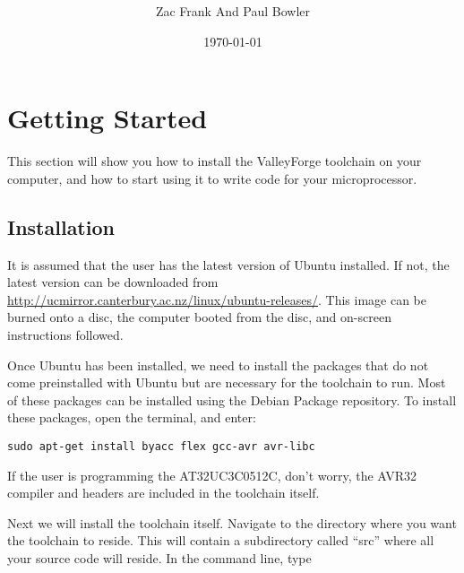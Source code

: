 \documentclass[a4paper, oneside, 11pt, titlepage, onecolumn, openright]{article}
\title{\projecttitle \\ \documenttitle}
\author{Zac Frank And Paul Bowler}
\date{\today}
\begin{document}
	\maketitle
	
	\clearpage
	\tableofcontents



	\clearpage

\section{Getting Started}
			\label{s:Getting Started}

			This section will show you how to install the ValleyForge toolchain on your computer, and how to start using it to write code for your microprocessor.

	\subsection{Installation }
			\label{ss:Installation}

			It is assumed that the user has the latest version of Ubuntu installed. If not, the latest version can be downloaded from \url{http://ucmirror.canterbury.ac.nz/linux/ubuntu-releases/}. This image can be burned onto a disc, the computer booted from the disc, and on-screen instructions followed.
			
			Once Ubuntu has been installed, we need to install the packages that do not come preinstalled with Ubuntu but are necessary for the toolchain to run. Most of these packages can be installed using the Debian Package repository. To install these packages, open the terminal, and enter:
			
\begin{lstlisting}
sudo apt-get install byacc flex gcc-avr avr-libc
\end{lstlisting}

			If the user is programming the AT32UC3C0512C, don't worry, the AVR32 compiler and headers are included in the toolchain itself.

			Next we will install the toolchain itself. Navigate to the directory where you want the toolchain to reside. This will contain a subdirectory called ``src'' where all your source code will reside.
In the command line, type \newline
\end{document}
